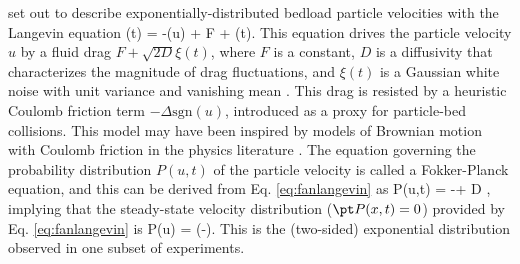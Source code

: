 \citet{Fan2014} set out to describe exponentially-distributed bedload particle velocities with the Langevin equation
\be {}(t) = -\Delta {}(u) + F + \xi(t). \label{eq:fanlangevin}\ee
This equation drives the particle velocity $u$ by a fluid drag $F + \sqrt{2D} \xi(t)$, where $F$ is a constant, $D$ is a diffusivity that characterizes the magnitude of drag fluctuations, and $\xi(t)$ is a Gaussian white noise with unit variance and vanishing mean \citep{Gardiner1983}.
This drag is resisted by a heuristic Coulomb friction term $-\Delta \text{sgn}(u)$, introduced as a proxy for particle-bed collisions. This model may have been inspired by models of Brownian motion with Coulomb friction in the physics literature \citep[e.g.][]{DeGennes2005,Touchette2010,Menzel2011}.
The equation governing the probability distribution $P(u,t)$ of the particle velocity is called a Fokker-Planck equation, and this can be derived from Eq. \ref{eq:fanlangevin} as \citep{Risken1989,VanKampen2007} 
\be {} P(u,t) = -\Delta{} + D ,\ee
implying that the steady-state velocity distribution ($\pt P(x,t) = 0$) provided by Eq. \ref{eq:fanlangevin} is
\be P(u) = \exp\Big(-\Big).\ee
This is the (two-sided) exponential distribution observed in one subset of experiments.

